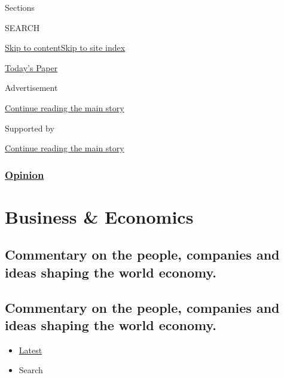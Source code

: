 Sections

SEARCH

\protect\hyperlink{site-content}{Skip to
content}\protect\hyperlink{site-index}{Skip to site index}

\href{https://myaccount.nytimes3xbfgragh.onion/auth/login?response_type=cookie\&client_id=vi}{}

\href{https://www.nytimes3xbfgragh.onion/section/todayspaper}{Today's
Paper}

Advertisement

\protect\hyperlink{after-top}{Continue reading the main story}

Supported by

\protect\hyperlink{after-sponsor}{Continue reading the main story}

\hypertarget{opinion}{%
\subsubsection{\texorpdfstring{\href{/section/opinion}{Opinion}}{Opinion}}\label{opinion}}

\hypertarget{business--economics}{%
\section{Business \& Economics}\label{business--economics}}

\hypertarget{commentary-on-the-people-companies-and-ideas-shaping-the-world-economy}{%
\subsection{Commentary on the people, companies and ideas shaping the
world
economy.}\label{commentary-on-the-people-companies-and-ideas-shaping-the-world-economy}}

\hypertarget{commentary-on-the-people-companies-and-ideas-shaping-the-world-economy-1}{%
\subsection{Commentary on the people, companies and ideas shaping the
world
economy.}\label{commentary-on-the-people-companies-and-ideas-shaping-the-world-economy-1}}

\begin{itemize}
\tightlist
\item
  \protect\hyperlink{stream-panel}{Latest}
\item
  Search
\end{itemize}

